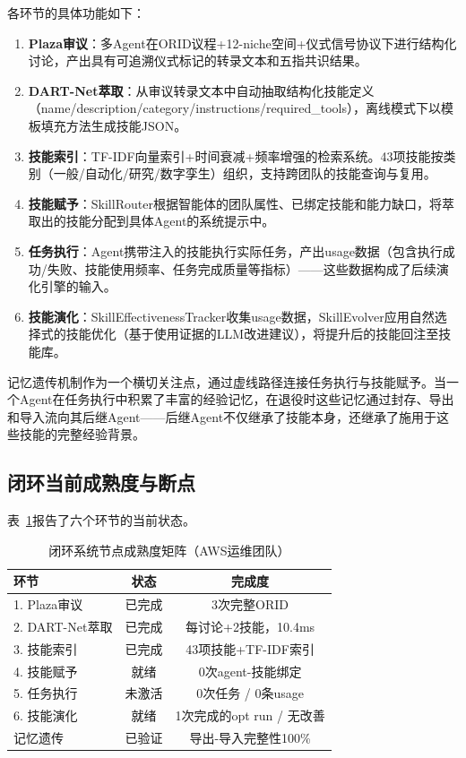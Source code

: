 \documentclass[twocolumn,10.5pt]{ctexart}
\begin{document}
各环节的具体功能如下：
\begin{enumerate}[itemsep=0pt,topsep=0pt]
  \item \textbf{Plaza审议}：多Agent在ORID议程+12-niche空间+仪式信号协议下进行结构化讨论，产出具有可追溯仪式标记的转录文本和五指共识结果。
  \item \textbf{DART-Net萃取}：从审议转录文本中自动抽取结构化技能定义（name/description/category/instructions/required\_tools），离线模式下以模板填充方法生成技能JSON。
  \item \textbf{技能索引}：TF-IDF向量索引+时间衰减+频率增强的检索系统。43项技能按类别（一般/自动化/研究/数字孪生）组织，支持跨团队的技能查询与复用。
  \item \textbf{技能赋予}：SkillRouter根据智能体的团队属性、已绑定技能和能力缺口，将萃取出的技能分配到具体Agent的系统提示中。
  \item \textbf{任务执行}：Agent携带注入的技能执行实际任务，产出usage数据（包含执行成功/失败、技能使用频率、任务完成质量等指标）——这些数据构成了后续演化引擎的输入。
  \item \textbf{技能演化}：SkillEffectivenessTracker收集usage数据，SkillEvolver应用自然选择式的技能优化（基于使用证据的LLM改进建议），将提升后的技能回注至技能库。
\end{enumerate}

记忆遗传机制作为一个横切关注点，通过虚线路径连接任务执行与技能赋予。当一个Agent在任务执行中积累了丰富的经验记忆，在退役时这些记忆通过封存、导出和导入流向其后继Agent——后继Agent不仅继承了技能本身，还继承了施用于这些技能的完整经验背景。

\subsection{闭环当前成熟度与断点}

表~\ref{tab:loop_maturity}报告了六个环节的当前状态。

\begin{table}[t]
\centering
\caption{闭环系统节点成熟度矩阵（AWS运维团队）}
\label{tab:loop_maturity}
\setlength{\tabcolsep}{2pt}
\renewcommand{\arraystretch}{1.1}
\begin{tabular}{lcc}
\toprule
环节 & 状态 & 完成度 \\
\midrule
1. Plaza审议 & 已完成 & 3次完整ORID \\
2. DART-Net萃取 & 已完成 & 每讨论+2技能，10.4ms \\
3. 技能索引 & 已完成 & 43项技能+TF-IDF索引 \\
4. 技能赋予 & 就绪 & 0次agent-技能绑定 \\
5. 任务执行 & 未激活 & 0次任务 / 0条usage \\
6. 技能演化 & 就绪 & 1次完成的opt run / 无改善 \\
\midrule
记忆遗传 & 已验证 & 导出-导入完整性100\% \\
\bottomrule
\end{tabular}
\end{table}
\end{document}
